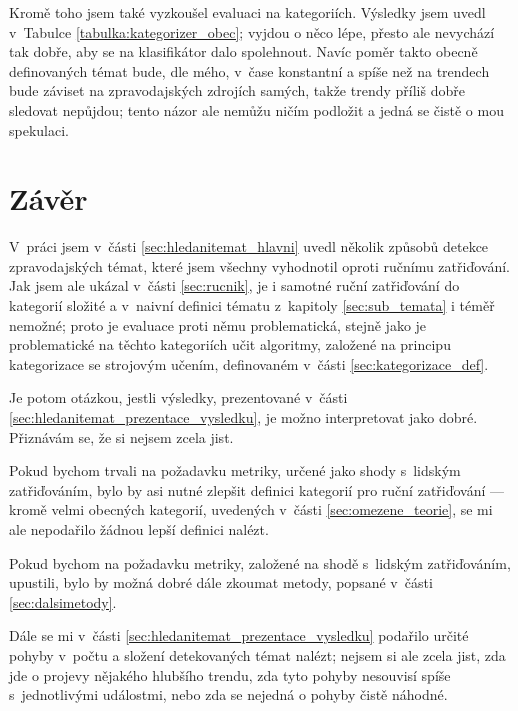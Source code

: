 \documentclass[12pt,a4paper]{report}
\begin{document}
Kromě toho jsem také vyzkoušel evaluaci na  kategoriích. Výsledky jsem uvedl v~Tabulce \ref{tabulka:kategorizer_obec}; vyjdou o něco lépe, přesto ale nevychází tak dobře, aby se na klasifikátor dalo spolehnout. Navíc poměr takto obecně definovaných témat bude, dle mého, v~čase konstantní a spíše než na trendech bude záviset na zpravodajských zdrojích samých, takže trendy příliš dobře sledovat nepůjdou; tento názor ale nemůžu ničím podložit a jedná se čistě o mou spekulaci.

\chapter*{Závěr}




V~práci jsem v~části \ref{sec:hledanitemat_hlavni} uvedl několik způsobů detekce zpravodajských témat, které jsem všechny vyhodnotil oproti ručnímu zatřiďování. Jak jsem ale ukázal v~části \ref{sec:rucnik}, je i samotné ruční zatřiďování do kategorií složité a v~naivní definici tématu z~kapitoly \ref{sec:sub_temata} i téměř nemožné; proto je evaluace proti němu problematická, stejně jako je problematické na těchto kategoriích učit algoritmy, založené na principu kategorizace se strojovým učením, definovaném v~části \ref{sec:kategorizace_def}.

Je potom otázkou, jestli výsledky, prezentované v~části \ref{sec:hledanitemat_prezentace_vysledku}, je možno interpretovat jako dobré. Přiznávám se, že si nejsem zcela jist.

Pokud bychom trvali na požadavku metriky, určené jako shody s~lidským zatřiďováním, bylo by asi nutné zlepšit definici kategorií pro ruční zatřiďování --- kromě velmi obecných kategorií, uvedených v~části \ref{sec:omezene_teorie}, se mi ale nepodařilo žádnou lepší definici nalézt. 

Pokud bychom na požadavku metriky, za\-lo\-že\-né na shodě s~lid\-ským za\-třiď\-o\-vá\-ním, upustili, bylo by možná dobré dále zkoumat metody, popsané v~části \ref{sec:dalsimetody}.

Dále se mi v~části \ref{sec:hledanitemat_prezentace_vysledku} podařilo určité pohyby v~počtu a složení detekovaných témat nalézt; nejsem si ale zcela jist, zda jde o projevy nějakého hlubšího trendu, zda tyto pohyby nesouvisí spíše s~jednotlivými událostmi, nebo zda se nejedná o pohyby čistě náhodné.
\end{document}
